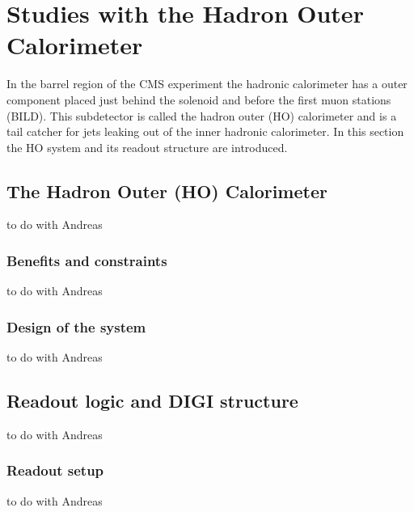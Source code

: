 \section{Studies with the Hadron Outer Calorimeter}
In the barrel region of the CMS experiment the hadronic calorimeter has a outer component placed just behind the solenoid and before the first muon stations (BILD). 
This subdetector is called the hadron outer (HO) calorimeter and is a tail catcher for jets leaking out of the inner hadronic calorimeter.
In this section the HO system and its readout structure are introduced.
	\subsection{The Hadron Outer (HO) Calorimeter}
		to do with Andreas
  		\subsubsection{Benefits and constraints}
			to do with Andreas
  		\subsubsection{Design of the system}
			to do with Andreas
	\subsection{Readout logic and DIGI structure}
		to do with Andreas
  		\subsubsection{Readout setup}
			to do with Andreas